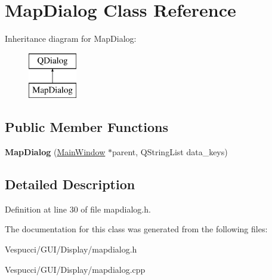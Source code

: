 \hypertarget{class_map_dialog}{}\section{Map\+Dialog Class Reference}
\label{class_map_dialog}
Inheritance diagram for Map\+Dialog\+:\begin{figure}[H]
\begin{center}
\leavevmode
\includegraphics[height=2.000000cm]{class_map_dialog}
\end{center}
\end{figure}
\subsection*{Public Member Functions}
\begin{DoxyCompactItemize}
\item 
{\bfseries Map\+Dialog} (\hyperlink{class_main_window}{Main\+Window} $\ast$parent, Q\+String\+List data\+\_\+keys)\hypertarget{class_map_dialog_a9776d3667a9a35a9288a8fe0b4ce782d}{}\label{class_map_dialog_a9776d3667a9a35a9288a8fe0b4ce782d}

\end{DoxyCompactItemize}


\subsection{Detailed Description}


Definition at line 30 of file mapdialog.\+h.



The documentation for this class was generated from the following files\+:\begin{DoxyCompactItemize}
\item 
Vespucci/\+G\+U\+I/\+Display/mapdialog.\+h\item 
Vespucci/\+G\+U\+I/\+Display/mapdialog.\+cpp\end{DoxyCompactItemize}

